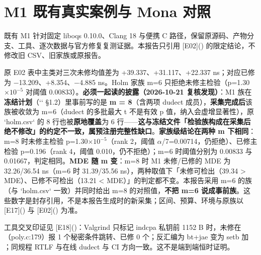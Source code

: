 \documentclass[UTF8,fontset=fandol,11pt,a4paper]{ctexart}
\begin{document}
\section{M1 既有真实案例与 Mona 对照}
既有 M1 针对固定 liboqs 0.10.0、Clang 18 与便携 C 路径，保留原源码、产物分支、工具、逐次数据与官方修复复测证据。本报告只引用 [E02](\texttt{}) 的限定结论，不修改旧 CSV、旧家族或原报告。


原 E02 表中主类对三次未修均值差为 +39.337、+31.117、+22.337 ns；对应已修为 \texorpdfstring{$-$}{-}13.209、+8.354、\texorpdfstring{$-$}{-}4.885 ns。Holm 家族 m=6 只拒绝未修主检验（p=1.30\texorpdfstring{$\times 10^{-5}$}{x10^-5} 对阈值 0.00833）。\textbf{必须一起读的披露（2026-10-21 复核发现）}：M1 族在\textbf{冻结计划}（`\texttt{}` §1.2）里事前写的是 \textbf{m = 8}（含两项 dudect 成员），\textbf{采集完成后}该族被收敛为 m=6（dudect 的多批最大 t 不是有效 p 值，纳入会虚增显著性），原 `holm.csv` 的 8 行也被\textbf{原地覆盖}为 6 行——\textbf{这与冻结文件「检验族构成在采集后绝不修改」的约定不一致，属预注册完整性缺口}。\textbf{家族级结论在两种 m 下相同}：m=8 时未修主检验 p=1.30\texorpdfstring{$\times 10^{-5}$}{x10^-5}（rank 2，阈值 \texorpdfstring{$\alpha$}{alpha}/7=0.00714，仍拒绝）、已修主检验 p=0.196（rank 4，阈值 0.010，仍不拒绝）；m=6 时阈值分别为 0.00833 与 0.01667，判定相同。\textbf{MDE 随 m 变}：m=8 时 M1 未修/已修的 MDE 为 32.26/36.54 ns（m=6 时 31.39/35.56 ns），两种取值下「未修可检出（39.34 > MDE）、已修不可检出（13.21 < MDE）」的判定都不变。本报告采用 m=6 的族（与 `holm.csv` 一致）并同时给出 m=8 的对照值，\textbf{不把 m=6 说成事前族}。这些数字是封存引用，不是本报告生成时的新采集；区间、预算、环境与原族以 [E17](\texttt{}) 与 [E02](\texttt{}) 为准。


工具交叉印证见 [E18](\texttt{})：Valgrind 只标记 indcpa 私钥前 1152 B 时，未修在 \texttt{}（poly.c:179）报 1 个秘密条件跳转、已修 0 个；反汇编为 bt+jae 变为 setb 加 \texttt{}；同规程 RTLF 与在线 dudect 与 CI 方向一致。这不是端到端恒时证明。
\end{document}
